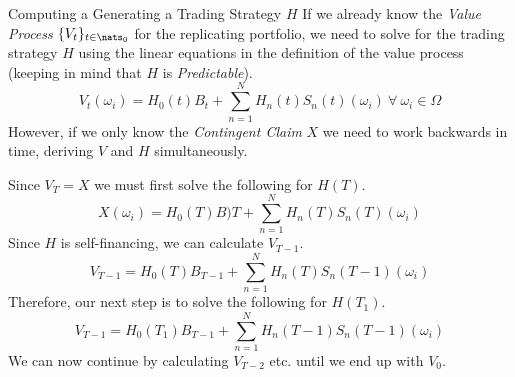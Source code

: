 \documentclass[11pt,a4paper]{article}
\begin{document}
  \begin{remark}{Computing a Generating a Trading Strategy $H$}
    If we already know the \textit{Value Process} $\{V_t\}_{t\in\nats_0}$ for the replicating portfolio, we need to solve for the trading strategy $H$ using the linear equations in the definition of the value process (keeping in mind that $H$ is \textit{Predictable}).
    \[ V_t(\omega_i)=H_0(t)B_t+\sum_{n=1}^NH_n(t)S_n(t)(\omega_i)\ \forall\ \omega_i\in\Omega \]
    However, if we only know the \textit{Contingent Claim} $X$ we need to work backwards in time, deriving $V$ and $H$ simultaneously.
    \par Since $V_T=X$ we must first solve the following for $H(T)$.
    \[ X(\omega_i)=H_0(T)B)T+\sum_{n=1}^NH_n(T)S_n(T)(\omega_i) \]
    Since $H$ is self-financing, we can calculate $V_{T-1}$.
    \[ V_{T-1}=H_0(T)B_{T-1}+\sum_{n=1}^NH_n(T)S_n(T-1)(\omega_i) \]
    Therefore, our next step is to solve the following for $H(T_1)$.
    \[ V_{T-1}=H_0(T_1)B_{T-1}+\sum_{n=1}^NH_n(T-1)S_n(T-1)(\omega_i) \]
    We can now continue by calculating $V_{T-2}$ etc. until we end up with $V_0$.
  \end{remark}
\end{document}
